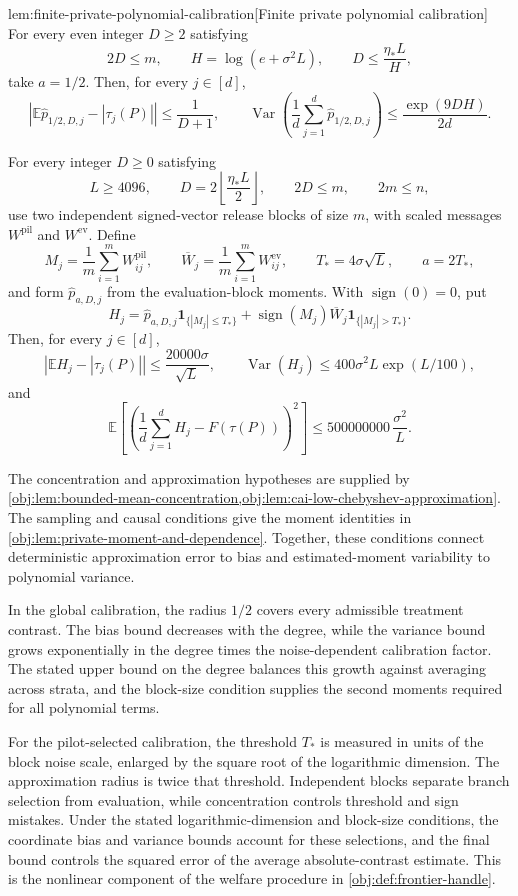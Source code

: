 \begin{lemmav}{lem:finite-private-polynomial-calibration}[Finite private polynomial calibration]
For every even integer \(D\ge2\) satisfying
\[
 2D\le m,\qquad
 H=\log(e+\sigma^2L),\qquad
 D\le\frac{\eta_*L}{H},
\]
take \(a=1/2\). Then, for every \(j\in[d]\),
\[
 \left|\mathbb E\widehat p_{1/2,D,j}-|\tau_j(P)|\right|
 \le\frac1{D+1},
 \qquad
 \operatorname{Var}\!\left(\frac1d\sum_{j=1}^d
                    \widehat p_{1/2,D,j}\right)
 \le\frac{\exp(9DH)}{2d}.
\]

For every integer \(D\ge0\) satisfying
\[
 L\ge4096,\qquad
 D=2\left\lfloor\frac{\eta_*L}{2}\right\rfloor,\qquad
 2D\le m,\qquad
 2m\le n,
\]
use two independent signed-vector release blocks of size \(m\), with scaled messages \(W^{\mathrm{pil}}\) and \(W^{\mathrm{ev}}\). Define
\[
 M_j=\frac1m\sum_{i=1}^mW^{\mathrm{pil}}_{ij},\qquad
 \overline W_j=\frac1m\sum_{i=1}^mW^{\mathrm{ev}}_{ij},\qquad
 T_*=4\sigma\sqrt L,\qquad a=2T_*,
\]
and form \(\widehat p_{a,D,j}\) from the evaluation-block moments. With \(\operatorname{sign}(0)=0\), put
\[
 H_j=\widehat p_{a,D,j}\mathbf1_{\{|M_j|\le T_*\}}
       +\operatorname{sign}(M_j)\overline W_j
          \mathbf1_{\{|M_j|>T_*\}}.
\]
Then, for every \(j\in[d]\),
\[
 \left|\mathbb EH_j-|\tau_j(P)|\right|
 \le\frac{20000\sigma}{\sqrt L},
 \qquad
 \operatorname{Var}(H_j)
 \le400\sigma^2L\exp(L/100),
\]
and
\[
 \mathbb E\!\left[
   \left(\frac1d\sum_{j=1}^dH_j-F(\tau(P))\right)^2
 \right]
 \le500000000\,\frac{\sigma^2}{L}.
\]
\end{lemmav}

The concentration and approximation hypotheses are supplied by \cref{obj:lem:bounded-mean-concentration,obj:lem:cai-low-chebyshev-approximation}. The sampling and causal conditions give the moment identities in \cref{obj:lem:private-moment-and-dependence}. Together, these conditions connect deterministic approximation error to bias and estimated-moment variability to polynomial variance.

In the global calibration, the radius \(1/2\) covers every admissible treatment contrast. The bias bound decreases with the degree, while the variance bound grows exponentially in the degree times the noise-dependent calibration factor. The stated upper bound on the degree balances this growth against averaging across strata, and the block-size condition supplies the second moments required for all polynomial terms.

For the pilot-selected calibration, the threshold \(T_*\) is measured in units of the block noise scale, enlarged by the square root of the logarithmic dimension. The approximation radius is twice that threshold. Independent blocks separate branch selection from evaluation, while concentration controls threshold and sign mistakes. Under the stated logarithmic-dimension and block-size conditions, the coordinate bias and variance bounds account for these selections, and the final bound controls the squared error of the average absolute-contrast estimate. This is the nonlinear component of the welfare procedure in \cref{obj:def:frontier-handle}.
